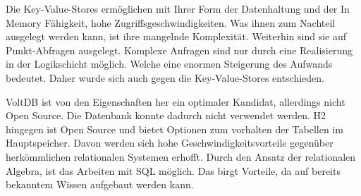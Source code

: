 Die Key-Value-Stores ermöglichen mit Ihrer Form der Datenhaltung und der In Memory Fähigkeit, hohe Zugriffsgeschwindigkeiten. Was ihnen zum Nachteil ausgelegt werden kann, ist ihre mangelnde Komplexität. Weiterhin sind sie auf Punkt-Abfragen ausgelegt. Komplexe Anfragen sind nur durch eine Realisierung in der Logikschicht möglich. Welche eine enormen Steigerung des Aufwands bedeutet. Daher wurde sich auch gegen die Key-Value-Stores entschieden. 

VoltDB ist von den Eigenschaften her ein optimaler Kandidat, allerdings nicht Open Source. Die Datenbank konnte dadurch nicht verwendet werden. H2 hingegen ist Open Source und bietet Optionen zum vorhalten der Tabellen im Hauptspeicher. Davon werden sich hohe Geschwindigkeitsvorteile gegenüber herkömmlichen relationalen Systemen erhofft. Durch den Ansatz der relationalen Algebra, ist das Arbeiten mit SQL möglich. Das birgt Vorteile, da auf bereits bekanntem Wissen aufgebaut werden kann.
